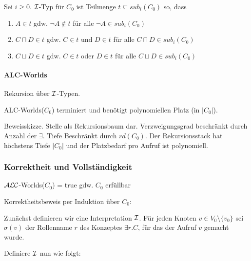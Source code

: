 \begin{definition}[$i$-Typ]

Sei $i \geq 0$. $\mathcal{I}$-Typ für $C_{0}$ ist Teilmenge
$t \subseteq sub_{i}\left( C_{0} \right)$ so, dass

\begin{enumerate}
\def\labelenumi{\arabic{enumi}.}
\item
  $A \in t$ gdw. $\neg A \notin t$ für alle
  $\neg A \in sub_{i}\left( C_{0} \right)$
\item
  $C \sqcap D \in t$ gdw. $C \in t$ und $D \in t$ für alle
  $C \sqcap D \in sub_{i}\left( C_{0} \right)$
\item
  $C \sqcup D \in t$ gdw. $C \in t$ oder $D \in t$ für alle
  $C \sqcup D \in sub_{i}\left( C_{0} \right)$
\end{enumerate}
\end{definition}

\paragraph{ALC-Worlds}\label{alc-worlds-1}

Rekursion über $\mathcal{I}$-Typen.

\begin{proposition}
ALC-Worlds($C_{0}$) terminiert und benötigt polynomiellen Platz (in $|C_0|$).
\end{proposition}

Beweisskizze. Stelle als Rekursionsbaum dar. Verzweigungsgrad beschränkt durch Anzahl der $\exists$. Tiefe Beschränkt durch $rd(C_{0})$. Der Rekursionsstack hat höchstens Tiefe $\left| C_{0} \right|$ und der Platzbedarf pro Aufruf ist polynomiell.

\subsubsection{Korrektheit und Vollständigkeit}\label{proposition-5.18}

\begin{proposition}
$\mathcal{A}\mathcal{L}\mathcal{C}$-Worlds($C_0$) = true gdw. $C_0$ erfüllbar
\end{proposition}

Korrektheitsbeweis per Induktion über $C_{0}$:

Zunächst definieren wir eine Interpretation $\mathcal{I}$. Für jeden Knoten $v \in V_0 \setminus \{v_0\}$ sei $\sigma (v)$ der Rollenname $r$ des Konzeptes $\exists r.C$, für das der Aufruf $v$ gemacht wurde.

Definiere $\mathcal{I}$ nun wie folgt:

